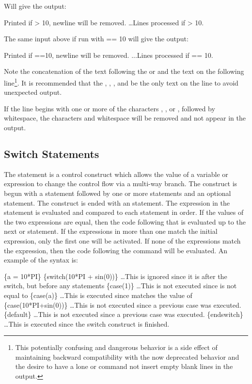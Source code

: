 Will give the output:
\begin{apout}
  Printed if  > 10, newline will be removed. \ldots Lines processed if  > 10.
\end{apout}

The same input above if run with  == 10 will give the output:
\begin{apout}
  Printed if ==10, newline will be removed. ...Lines processed if  == 10.
\end{apout}

Note the concatenation of the text following the  or
 and the text on the following line\footnote{This
potentially confusing and dangerous behavior is a side effect of
maintaining backward compatibility with the now deprecated
 behavior and the desire to have a lone  or
 command not insert empty blank lines in the
output.}. It is recommended that the , ,
, and  be the only text on the line to avoid
unexpected output.

If the line begins with one or more of the characters \cmd{\#}, \cmd{\$}, or \cmd{//}, followed by whitespace, the characters and whitespace will be removed and not appear in the output.

\subsection{Switch Statements}
The  statement is a control construct which allows the value of a variable or expression to change the control flow via a multi-way branch.
The construct is begun with a  statement followed by one or more  statements and an optional  statement. The construct is ended with an  statement.  The expression in the  statement is evaluated and compared to each  statement in order.  If the values of the two expressions are equal, then the code following that  is evaluated up to the next  or  statement. If the expressions in more than one  match the initial  expression, only the first one will be activated.  If none of the  expressions match the  expression, then the code following the  command will be evaluated. An example of the syntax is:

\begin{apinp}
\{a = 10*PI\}
\{switch(10*PI + sin(0))\}
\ldots This is ignored since it is after the switch, but before any  statements
\{case(1)\}
\ldots This is not executed since  is not equal to 
\{case(a)\}
\ldots This is executed since  matches the value of 
\{case(10*PI+sin(0))\}
\ldots This is not executed since a previous case was executed.
\{default\}
\ldots This is not executed since a previous case was executed.
\{endswitch\}
\ldots This is executed since the switch construct
 is finished.
\end{apinp}

